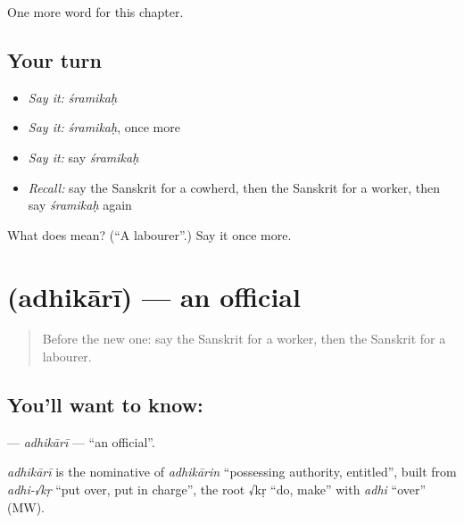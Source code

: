 \begin{grammarlens}[title={What you've built}]
One more word for this chapter.
\end{grammarlens}

\subsection*{Your turn}
\begin{itemize}
\raggedright
  \item \emph{Say it:} \emph{śramikaḥ}
  \item \emph{Say it:} \emph{śramikaḥ}, once more
  \item \emph{Say it:} say \emph{śramikaḥ}
  \item \emph{Recall:} say the Sanskrit for a cowherd, then the Sanskrit for a worker, then say \emph{śramikaḥ} again
\end{itemize}

\begin{tcolorbox}[breakable,colback=teal!4,colframe=teal!35!black,title={Before you move on}]
What does  mean? (\textquotedblleft{}A labourer\textquotedblright{}.) Say it once more.
\end{tcolorbox}
\section[\texorpdfstring{\sk{अधिकारी} (adhikārī)}{अधिकारी (adhikārī)}]{ (adhikārī) — an official}

\label{lesson:SA-C149-adhikari}



\begin{quote}
Before the new one: say the Sanskrit for a worker, then the Sanskrit for a labourer.
\end{quote}

\subsection*{You'll want to know: }
\textbf{} — \emph{adhikārī} — \textquotedblleft{}an official\textquotedblright{}.

\begin{cousinweb}
\emph{adhikārī} is the nominative of \emph{adhikārin} \textquotedblleft{}possessing authority, entitled\textquotedblright{}, built from \emph{adhi-√kṛ} \textquotedblleft{}put over, put in charge\textquotedblright{}, the root √kṛ \textquotedblleft{}do, make\textquotedblright{} with \emph{adhi} \textquotedblleft{}over\textquotedblright{} (MW).
\end{cousinweb}

